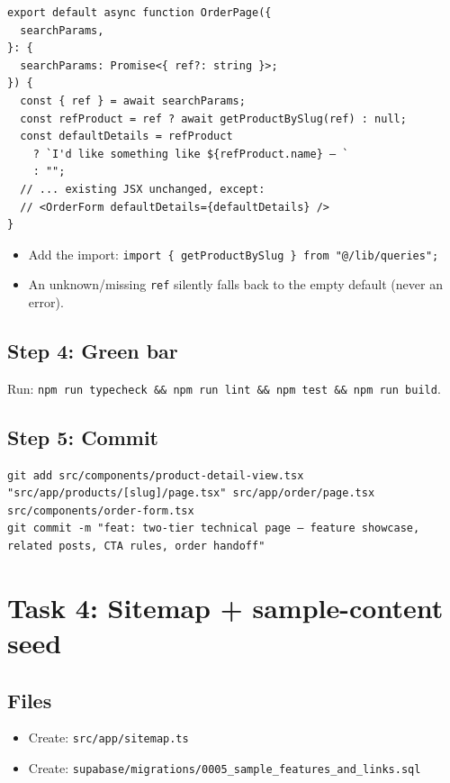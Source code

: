 \documentclass[11pt,a4paper]{article}
\begin{document}
\begin{lstlisting}
export default async function OrderPage({
  searchParams,
}: {
  searchParams: Promise<{ ref?: string }>;
}) {
  const { ref } = await searchParams;
  const refProduct = ref ? await getProductBySlug(ref) : null;
  const defaultDetails = refProduct
    ? `I'd like something like ${refProduct.name} — `
    : "";
  // ... existing JSX unchanged, except:
  // <OrderForm defaultDetails={defaultDetails} />
}
\end{lstlisting}

\begin{itemize}
  \item Add the import: \texttt{import \{ getProductBySlug \} from "@/lib/queries";}
  \item An unknown/missing \texttt{ref} silently falls back to the empty default (never an error).
\end{itemize}

\subsection*{Step 4: Green bar}

Run: \texttt{npm run typecheck \&\& npm run lint \&\& npm test \&\& npm run build}.

\subsection*{Step 5: Commit}

\begin{lstlisting}
git add src/components/product-detail-view.tsx "src/app/products/[slug]/page.tsx" src/app/order/page.tsx src/components/order-form.tsx
git commit -m "feat: two-tier technical page — feature showcase, related posts, CTA rules, order handoff"
\end{lstlisting}

\section{Task 4: Sitemap + sample-content seed}

\subsection*{Files}
\begin{itemize}
  \item Create: \texttt{src/app/sitemap.ts}
  \item Create: \texttt{supabase/migrations/0005\_sample\_features\_and\_links.sql}
\end{itemize}
\end{document}
